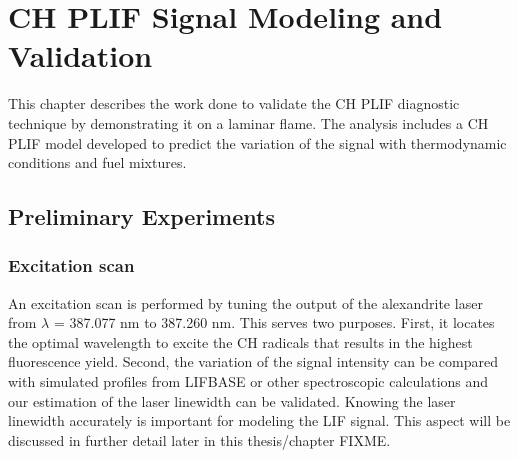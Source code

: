 \chapter{CH PLIF Signal Modeling and Validation}





This chapter describes the work done to validate the CH PLIF diagnostic technique by demonstrating it on a laminar flame.
The analysis includes a CH PLIF model developed to predict the variation of the signal with thermodynamic conditions and fuel mixtures.

\section{Preliminary Experiments}

\subsection{Excitation scan}
\label{sec:excitationscan}

An excitation scan is performed by tuning the output of the alexandrite laser from \(\lambda\) = 387.077 nm to 387.260 nm.
This serves two purposes.
First, it locates the optimal wavelength to excite the CH radicals that results in the highest fluorescence yield.
Second, the variation of the signal intensity can be compared with simulated profiles from LIFBASE or other spectroscopic calculations and our estimation of the laser linewidth can be validated.
Knowing the laser linewidth accurately is important for modeling the LIF signal.
This aspect will be discussed in further detail later in this thesis/chapter FIXME.

